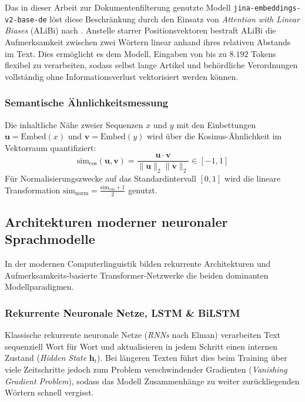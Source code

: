 Das in dieser Arbeit zur Dokumentenfilterung genutzte Modell \texttt{jina-embeddings-v2-base-de} \citep{gunther2023jina} löst diese Beschränkung durch den Einsatz von \textit{Attention with Linear Biases} (ALiBi) nach \citet{press2021train}. Anstelle starrer Positionsvektoren bestraft ALiBi die Aufmerksamkeit zwischen zwei Wörtern linear anhand ihres relativen Abstands im Text. Dies ermöglicht es dem Modell, Eingaben von bis zu $8.192$ Tokens flexibel zu verarbeiten, sodass selbst lange Artikel und behördliche Verordnungen vollständig ohne Informationsverlust vektorisiert werden können.

\subsubsection{Semantische Ähnlichkeitsmessung}
Die inhaltliche Nähe zweier Sequenzen $x$ und $y$ mit den Einbettungen $\mathbf{u} = \text{Embed}(x)$ und $\mathbf{v} = \text{Embed}(y)$ wird über die Kosinus-Ähnlichkeit im Vektorraum quantifiziert:
\begin{equation}
    \text{sim}_{\cos}(\mathbf{u}, \mathbf{v}) = \frac{\mathbf{u} \cdot \mathbf{v}}{\|\mathbf{u}\|_2 \|\mathbf{v}\|_2} \in [-1, 1]
\end{equation}
Für Normalisierungszwecke auf das Standardintervall $[0, 1]$ wird die lineare Transformation $\text{sim}_{\text{norm}} = \frac{\text{sim}_{\cos} + 1}{2}$ genutzt.

\subsection{Architekturen moderner neuronaler Sprachmodelle}
\label{sec:architekturen_sprachmodelle}

In der modernen Computerlinguistik bilden rekurrente Architekturen und Aufmerksamkeits-basierte Transformer-Netzwerke die beiden dominanten Modellparadigmen.

\subsubsection{Rekurrente Neuronale Netze, LSTM \& BiLSTM}
Klassische rekurrente neuronale Netze (\textit{RNNs} nach Elman) verarbeiten Text sequenziell Wort für Wort und aktualisieren in jedem Schritt einen internen Zustand (\textit{Hidden State} $\mathbf{h}_t$). Bei längeren Texten führt dies beim Training über viele Zeitschritte jedoch zum Problem verschwindender Gradienten (\textit{Vanishing Gradient Problem}), sodass das Modell Zusammenhänge zu weiter zurückliegenden Wörtern schnell vergisst.


